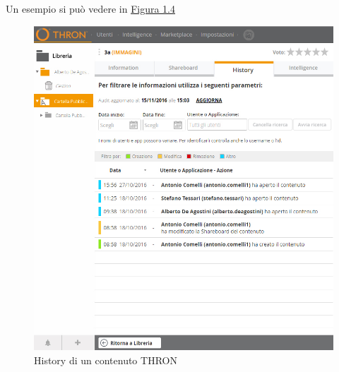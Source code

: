 \documentclass[a4paper, 12pt, twoside, openright]{book}
\begin{document}
Un esempio si può vedere in \hyperref[content-history]{Figura 1.4}
\begin{figure}[H]
	\centering
	\label{content-history}
	\includegraphics[width=1.0\textwidth]{images/content-history.jpg}
	\caption{History di un contenuto THRON}
\end{figure}
\end{document}
